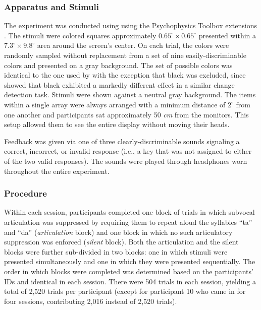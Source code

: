 \subsubsection{Apparatus and Stimuli} %
The experiment was conducted using \citet{MATLAB:2011} using the Psychophysics Toolbox extensions \citep{Brainard:1997, Kleiner:etal:2007, Pelli:1997}. The stimuli were colored squares approximately $0.65^{\circ} \times 0.65^{\circ}$ presented within a $7.3^{\circ} \times 9.8^{\circ}$ area around the screen's center. On each trial, the colors were randomly sampled without replacement from a set of nine easily-discriminable colors and presented on a gray background. The set of possible colors was identical to the one used by \citet{Rouder:etal:2008b} with the exception that black was excluded, since \citet{Morey:2011} showed that black exhibited a markedly different effect in a similar change detection task. Stimuli were shown against a neutral gray background. The items within a single array were always arranged with a minimum distance of $2^{\circ}$ from one another and participants sat approximately 50 \emph{cm} from the monitors. This setup allowed them to see the entire display without moving their heads.

Feedback was given via one of three clearly-discriminable sounds signaling a correct, incorrect, or invalid response (i.e., a key that was not assigned to either of the two valid responses). The sounds were played through headphones worn throughout the entire experiment.



\subsubsection{Procedure} %
Within each session, participants completed one block of trials in which subvocal articulation was suppressed by requiring them to repeat aloud the syllables ``ta'' and ``da'' (\emph{articulation} block) and one block in which no such articulatory suppression was enforced (\emph{silent} block). Both the articulation and the silent blocks were further sub-divided in two blocks: one in which stimuli were presented simultaneously and one in which they were presented sequentially. The order in which blocks were completed was determined based on the participants' IDs and identical in each session. There were 504 trials in each session, yielding a total of 2,520 trials per participant (except for participant 10 who came in for four sessions, contributing 2,016 instead of 2,520 trials).

